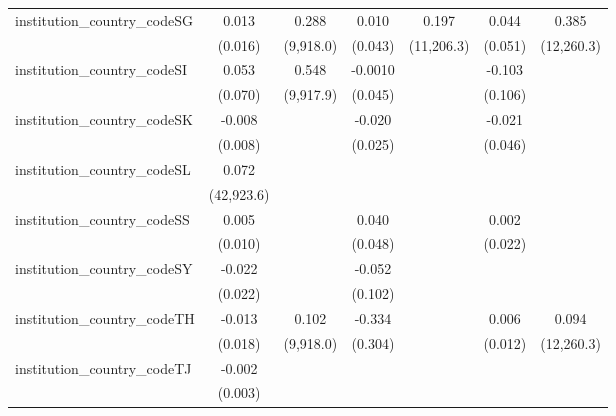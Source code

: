 \begin{tabular}{lcccccc}
   institution\_country\_codeSG          & 0.013          & 0.288         & 0.010         & 0.197        & 0.044        & 0.385\\   
                                         & (0.016)        & (9,918.0)     & (0.043)       & (11,206.3)   & (0.051)      & (12,260.3)\\   
   institution\_country\_codeSI          & 0.053          & 0.548         & -0.0010       &              & -0.103       &   \\   
                                         & (0.070)        & (9,917.9)     & (0.045)       &              & (0.106)      &   \\   
   institution\_country\_codeSK          & -0.008         &               & -0.020        &              & -0.021       &   \\   
                                         & (0.008)        &               & (0.025)       &              & (0.046)      &   \\   
   institution\_country\_codeSL          & 0.072          &               &               &              &              &   \\   
                                         & (42,923.6)     &               &               &              &              &   \\   
   institution\_country\_codeSS          & 0.005          &               & 0.040         &              & 0.002        &   \\   
                                         & (0.010)        &               & (0.048)       &              & (0.022)      &   \\   
   institution\_country\_codeSY          & -0.022         &               & -0.052        &              &              &   \\   
                                         & (0.022)        &               & (0.102)       &              &              &   \\   
   institution\_country\_codeTH          & -0.013         & 0.102         & -0.334        &              & 0.006        & 0.094\\   
                                         & (0.018)        & (9,918.0)     & (0.304)       &              & (0.012)      & (12,260.3)\\   
   institution\_country\_codeTJ          & -0.002         &               &               &              &              &   \\   
                                         & (0.003)        &               &               &              &              &   \\   

\end{tabular}
